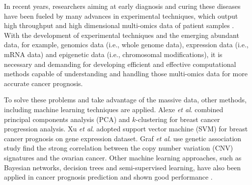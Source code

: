 \documentclass{article}
\begin{document}
In recent years, researchers aiming at early diagnosis and curing these diseases have been fueled by many advances in experimental techniques, which output high throughput and high dimensional multi-omics data of patient samples \cite[][]{wooster2003breast,goossens2015cancer}. With the development of experimental techniques and the emerging abundant data, for example, genomics data (i.e., whole genome data), expression data (i.e., mRNA data) and epigenetic data (i.e., chromosomal modifications), it is necessary and demanding for developing efficient and effective computational methods capable of understanding and handling those multi-omics data for more accurate cancer prognosis\cite[]{zhu2020application}. 


To solve these problems and take advantage of the massive data, other methods, including machine learning techniques are applied. Alexe \textit{et al}. \cite[]{alexe2007analysis} combined principal components analysis (PCA) and $k$-clustering for breast cancer progression analysis. Xu \textit{et al}. \cite[]{xu2012gene} adopted support vector machine (SVM) for breast cancer prognosis on gene expression dataset. Graf \textit{et al}. \cite[]{graf2021association} use genetic association study find the strong correlation between the copy number variation (CNV) signatures and the ovarian cancer. Other machine learning approaches, such as Bayesian networks, decision trees and semi-supervised learning, have also been applied in cancer prognosis prediction and shown good performance \cite[]{kourou2015machine}.
\end{document}
